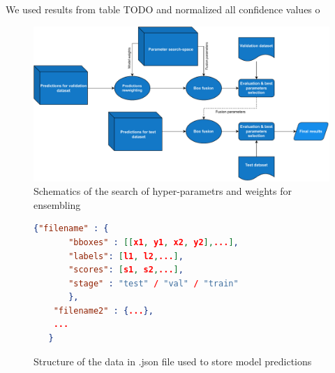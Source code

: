 We used results from table TODO and normalized all confidence values o
\begin{figure}
    \centering
    \includegraphics[width=\linewidth]{images/ensemble_search_diag.drawio.pdf}
    \caption{Schematics of the search of hyper-parametrs and weights for ensembling}
    \label{fig:diag:ense_search}
\end{figure}

\begin{figure}
    \centering
    \begin{lstlisting}[language=json, numbers=none]
   {"filename" : {
       "bboxes" : [[x1, y1, x2, y2],...],
       "labels": [l1, l2,...],
       "scores": [s1, s2,...],
       "stage" : "test" / "val" / "train"
       },
    "filename2" : {...},
    ...
   }
\end{lstlisting}
    \caption{Structure of the data in .json file used to store model predictions}
    \label{fig:predictions_json}
\end{figure}